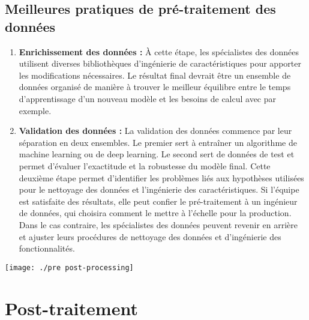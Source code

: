 \documentclass[a4paper, 12pt]{article}
\begin{document}
	
	\subsection{Meilleures pratiques de pré-traitement des données}
	\begin{enumerate}
		\item \textbf{Enrichissement des données :}
		À cette étape, les spécialistes des données utilisent diverses bibliothèques d'ingénierie de caractéristiques pour apporter les modifications nécessaires. Le résultat final devrait être un ensemble de données organisé de manière à trouver le meilleur équilibre entre le temps d'apprentissage d'un nouveau modèle et les besoins de calcul avec par exemple.
		\item \textbf{Validation des données :}
		La validation des données commence par leur séparation en deux ensembles. Le premier sert à entraîner un algorithme de machine learning ou de deep learning. Le second sert de données de test et permet d'évaluer l'exactitude et la robustesse du modèle final. Cette deuxième étape permet d'identifier les problèmes liés aux hypothèses utilisées pour le nettoyage des données et l'ingénierie des caractéristiques.
		Si l'équipe est satisfaite des résultats, elle peut confier le pré-traitement à un ingénieur de données, qui choisira comment le mettre à l'échelle pour la production. Dans le cas contraire, les spécialistes des données peuvent revenir en arrière et ajuster leurs procédures de nettoyage des données et d'ingénierie des fonctionnalités.
	\end{enumerate}
	
		\begin{center}
			\texttt{[image: ./pre post-processing]}
		
		\end{center}
	
	\section{Post-traitement}
\end{document}
